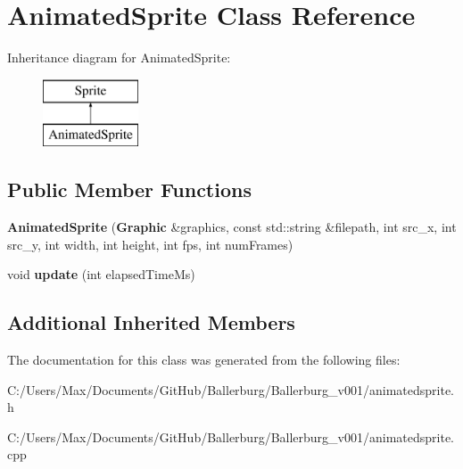 \section{Animated\+Sprite Class Reference}
\label{class_animated_sprite}
Inheritance diagram for Animated\+Sprite\+:\begin{figure}[H]
\begin{center}
\leavevmode
\includegraphics[height=2.000000cm]{class_animated_sprite}
\end{center}
\end{figure}
\subsection*{Public Member Functions}
\begin{DoxyCompactItemize}
\item 
{\bfseries Animated\+Sprite} ({\bf Graphic} \&graphics, const std\+::string \&filepath, int src\+\_\+x, int src\+\_\+y, int width, int height, int fps, int num\+Frames)\label{class_animated_sprite_a2a1f34b3a8a73610e7ab0a8d741af37c}

\item 
void {\bfseries update} (int elapsed\+Time\+Ms)\label{class_animated_sprite_a18757c4843c4022bd1a021e5679ba072}

\end{DoxyCompactItemize}
\subsection*{Additional Inherited Members}


The documentation for this class was generated from the following files\+:\begin{DoxyCompactItemize}
\item 
C\+:/\+Users/\+Max/\+Documents/\+Git\+Hub/\+Ballerburg/\+Ballerburg\+\_\+v001/animatedsprite.\+h\item 
C\+:/\+Users/\+Max/\+Documents/\+Git\+Hub/\+Ballerburg/\+Ballerburg\+\_\+v001/animatedsprite.\+cpp\end{DoxyCompactItemize}
